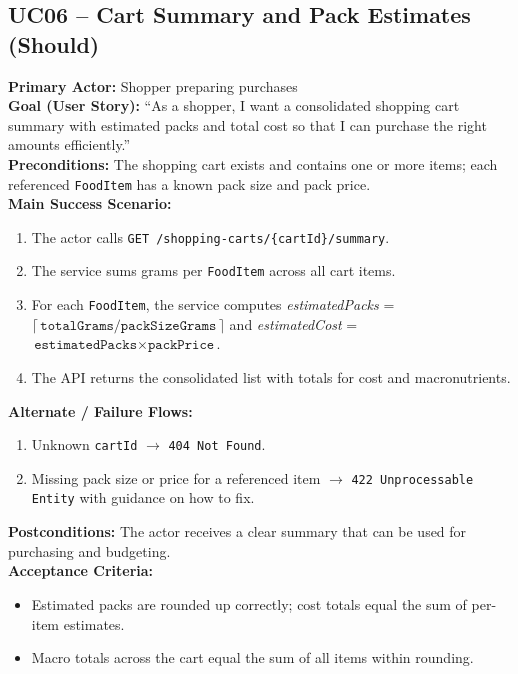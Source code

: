 \documentclass[11pt]{article}
\begin{document}
\subsection*{UC06 -- Cart Summary and Pack Estimates (Should)}
\textbf{Primary Actor:} Shopper preparing purchases\\
\textbf{Goal (User Story):} ``As a shopper, I want a consolidated shopping cart summary with estimated packs and total cost so that I can purchase the right amounts efficiently.''\\
\textbf{Preconditions:} The shopping cart exists and contains one or more items; each referenced \texttt{FoodItem} has a known pack size and pack price.\\
\textbf{Main Success Scenario:}
\begin{enumerate}[label=\arabic*.]
  \item The actor calls \texttt{GET /shopping-carts/\{cartId\}/summary}.
  \item The service sums grams per \texttt{FoodItem} across all cart items.
  \item For each \texttt{FoodItem}, the service computes \textit{estimatedPacks} = \(\lceil\,\texttt{totalGrams} / \texttt{packSizeGrams}\,\rceil\) and \textit{estimatedCost} = \(\texttt{estimatedPacks} \times \texttt{packPrice}\).
  \item The API returns the consolidated list with totals for cost and macronutrients.
\end{enumerate}
\textbf{Alternate / Failure Flows:}
\begin{enumerate}[label=\arabic*F.]
  \item Unknown \texttt{cartId} $\rightarrow$ \texttt{404 Not Found}.
  \item Missing pack size or price for a referenced item $\rightarrow$ \texttt{422 Unprocessable Entity} with guidance on how to fix.
\end{enumerate}
\textbf{Postconditions:} The actor receives a clear summary that can be used for purchasing and budgeting.\\
\textbf{Acceptance Criteria:}
\begin{itemize}[noitemsep]
  \item Estimated packs are rounded up correctly; cost totals equal the sum of per-item estimates.
  \item Macro totals across the cart equal the sum of all items within rounding.
\end{itemize}
\end{document}
